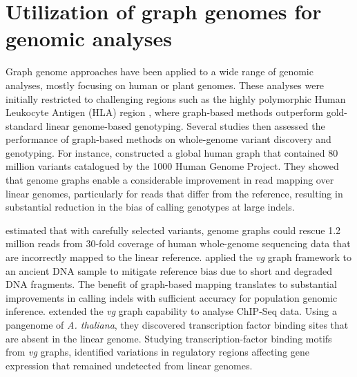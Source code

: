 \documentclass[../main.tex]{subfiles}
\begin{document}
\section[Utilization of the graph genomes]{Utilization of graph genomes for genomic analyses}

Graph genome approaches have been applied to a wide range of genomic analyses, mostly focusing on human or plant genomes. These analyses were initially restricted to challenging regions such as the highly polymorphic Human Leukocyte Antigen (HLA) region \citep{dilthey2015improved,lee2018kourami}, where graph-based methods outperform gold-standard linear genome-based genotyping. Several studies \citep{eggertsson2017graphtyper,garrison2018variation,sibbesen2018accurate,rakocevic2019fast} then assessed the performance of graph-based methods on whole-genome variant discovery and genotyping. For instance, \citet{garrison2018variation} constructed a global human graph that contained 80 million variants catalogued by the 1000 Human Genome Project. They showed that genome graphs enable a considerable improvement in read mapping over linear genomes, particularly for reads that differ from the reference, resulting in substantial reduction in the bias of calling genotypes at large indels. 

\citet{pritt2018forge} estimated that with carefully selected variants, genome graphs could rescue 1.2 million reads from 30-fold coverage of human whole-genome sequencing data that are incorrectly mapped to the linear reference. \citet{martiniano2019removing} applied the \emph{vg} graph framework to an ancient DNA sample to mitigate reference bias due to short and degraded DNA fragments. The benefit of graph-based mapping translates to substantial improvements in calling indels with sufficient accuracy for population genomic inference. \citet{grytten2019graph} extended the \emph{vg} graph capability to analyse ChIP-Seq data. Using a pangenome  of \emph{A. thaliana}, they discovered transcription factor binding sites that are absent in the linear genome. Studying transcription-factor binding motifs from \emph{vg} graphs, \citet{tognon2021grafimo} identified variations in regulatory regions affecting gene expression that remained undetected from linear genomes. 
\end{document}
